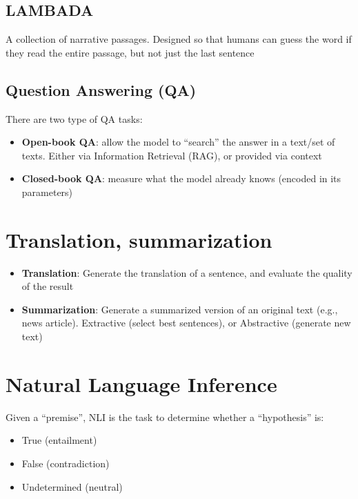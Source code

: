 \subsection{LAMBADA}
A collection of narrative passages. Designed so that humans can guess the word
if they read the entire passage, but not just the last sentence

\subsection{Question Answering (QA)}

There are two type of QA tasks:

\begin{itemize}
  \item \textbf{Open-book QA}: allow the model to “search” the answer in a text/set of texts. Either via Information Retrieval (RAG), or provided via context
  \item \textbf{Closed-book QA}: measure what the model already knows (encoded in its parameters)
\end{itemize}

\section{Translation, summarization}

\begin{itemize}
  \item \textbf{Translation}: Generate the translation of a sentence, and evaluate the quality of the result
  \item \textbf{Summarization}: Generate a summarized version of an original text (e.g., news article). Extractive (select best sentences), or Abstractive (generate new text)
\end{itemize}


\section{Natural Language Inference}

Given a “premise”, NLI is the task to
determine whether a “hypothesis” is:

\begin{itemize}
  \item True (entailment)
  \item False (contradiction)
  \item Undetermined (neutral)
\end{itemize}


